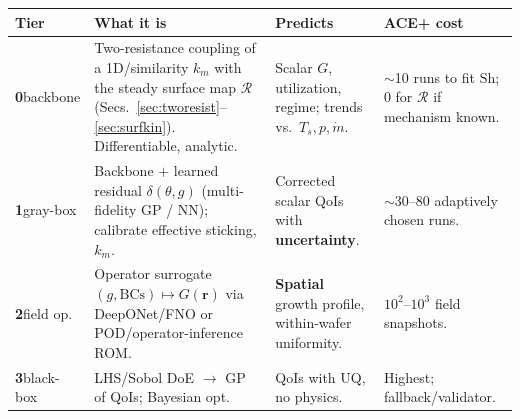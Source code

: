 \documentclass[11pt]{article}
\newcommand{\R}{\mathcal{R}}
\newcommand{\Sh}{\mathrm{Sh}}
\begin{document}
\begin{center}
\renewcommand{\arraystretch}{1.35}
\begin{tabular}{@{}p{1.6cm} p{4.4cm} p{4.0cm} p{3.6cm}@{}}
\toprule
\textbf{Tier} & \textbf{What it is} & \textbf{Predicts} & \textbf{ACE+ cost} \\
\midrule
\textbf{0}\newline backbone & Two-resistance coupling of a 1D/similarity $k_m$ with the steady surface map $\R$ (Secs.~\ref{sec:tworesist}--\ref{sec:surfkin}). Differentiable, analytic. & Scalar $G$, utilization, regime; trends vs.\ $T_s,p,\dot m$. & $\sim$10 runs to fit $\Sh$; 0 for $\R$ if mechanism known. \\
\textbf{1}\newline gray-box & Backbone $+$ learned residual $\delta(\theta,g)$ (multi-fidelity GP / NN); calibrate effective sticking, $k_m$. & Corrected scalar QoIs with \textbf{uncertainty}. & $\sim$30--80 adaptively chosen runs. \\
\textbf{2}\newline field op. & Operator surrogate $(g,\text{BCs})\!\mapsto\! G(\mathbf r)$ via DeepONet/FNO or POD/operator-inference ROM. & \textbf{Spatial} growth profile, within-wafer uniformity. & $10^2$--$10^3$ field snapshots. \\
\textbf{3}\newline black-box & LHS/Sobol DoE $\to$ GP of QoIs; Bayesian opt. & QoIs with UQ, no physics. & Highest; fallback/validator. \\
\bottomrule
\end{tabular}
\end{center}
\end{document}
